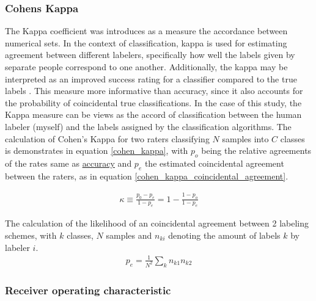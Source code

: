 		\subsubsection{Cohens Kappa}
			The Kappa coefficient was introduces as \cite{cohen1960coefficient} a measure the accordance between numerical sets. In the context of classification, kappa is used for estimating agreement between different labelers, specifically how well the labels given by separate people correspond to one another. Additionally, the kappa may be interpreted as an improved success rating for a classifier compared to the true labels \cite{castillo2011information}. This measure more informative than accuracy, since it also accounts for the probability of coincidental true classifications. In the case of this study, the Kappa measure can be views as the accord of classification between the human labeler (myself) and the labels assigned by the classification algorithms. The calculation of Cohen's Kappa for two raters classifying $ N $ samples into $ C $ classes is demonstrates in equation \ref{cohen_kappa}, with $ p_o $ being the relative agreements of the rates same as \hyperref[accuracy]{accuracy} and $ p_e $ the estimated coincidental agreement between the raters, as in equation \ref{cohen_kappa_coincidental_agreement}. 
			
			\begin{equation}
				\begin{aligned}
					\kappa \equiv \frac{p_0-p_e}{1-p_e} = 1 - \frac{1-p_o}{1-p_e}
				\end{aligned}
				\label{cohen_kappa}
			\end{equation}
		
		The calculation of the likelihood of an coincidental agreement between 2 labeling schemes, with $ k $ classes, $ N $ samples and $ n_{ki} $ denoting the amount of labels $ k $ by labeler $ i $.
			\begin{equation}
				\begin{aligned}
					p_e = \frac{1}{N^2}\sum_k n_{k1}n_{k2}
				\end{aligned}
				\label{cohen_kappa_coincidental_agreement}
			\end{equation}
		
		
		\subsubsection{Receiver operating characteristic}
